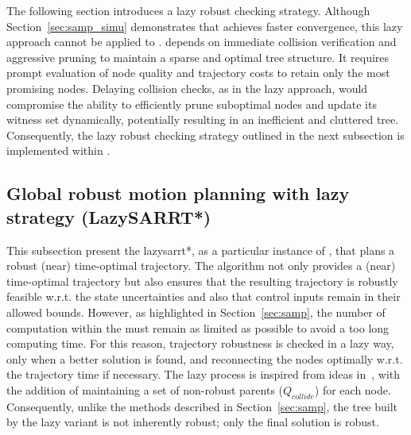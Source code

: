 The following section introduces a lazy robust checking strategy. 
Although Section~\ref{sec:samp_simu} demonstrates that  achieves faster convergence, this lazy approach cannot be applied to . 
 depends on immediate collision verification and aggressive pruning to maintain a sparse and optimal tree structure. 
It requires prompt evaluation of node quality and trajectory costs to retain only the most promising nodes.
Delaying collision checks, as in the lazy approach, would compromise the  ability to efficiently prune suboptimal nodes and update its witness set dynamically, potentially resulting in an inefficient and cluttered tree. 
Consequently, the lazy robust checking strategy outlined in the next subsection is implemented within .

\subsection{Global robust motion planning with lazy strategy (LazySARRT*)}\label{sec:lazy_rrt*}

This subsection present the \gls{lazysarrt*}, as a particular instance of , that plans a robust (near) time-optimal trajectory.
The algorithm not only provides a (near) time-optimal trajectory but also ensures that the resulting trajectory is robustly feasible w.r.t. the state uncertainties and also that control inputs remain in their allowed bounds.
However, as highlighted in Section~\ref{sec:samp}, the number of  computation within the  must remain as limited as possible to avoid a too long computing time. 
For this reason, trajectory robustness is checked in a lazy way, only when a better solution is found, and reconnecting the nodes optimally w.r.t. the trajectory time if necessary.
The lazy process is inspired from ideas in~\cite{cLazy1,cLazy2}, with the addition of maintaining a set of non-robust parents ($Q_{collide}$) for each node.
Consequently, unlike the  methods described in Section~\ref{sec:samp}, the tree built by the lazy variant is not inherently robust; only the final solution is robust.

